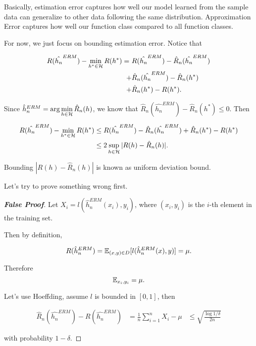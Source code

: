 \documentclass[../main.tex]{subfiles}
\begin{document}
	Basically, estimation error captures how well our model learned from the sample data can generalize to other data following the same distribution. Approximation Error captures how well our function class compared to all function classes.
	
	For now, we just focus on bounding estimation error. Notice that
	
	\begin{equation*}
		\begin{aligned}
				R(\hat{h_n}^{ERM}) - \min\limits_{h^* \in \mathcal{H}} R(h^*)  = \ &  R(\hat{h_n}^{ERM}) - \hat{R}_n(\hat{h_n}^{ERM}) \\
																		 + &\hat{R}_n(\hat{h_n}^{ERM}) - \hat{R}_n(h^*) \\
																		 + &\hat{R}_n(h^*) - R(h^*).
		\end{aligned}
	\end{equation*}
	
	Since $\hat{h}_n^{ERM} = \arg\min\limits_{h\in \mathcal{H}} \hat{R}_n(h)$, we know that $\hat{R}_n(\hat{h_n}^{ERM}) - \hat{R}_n(h^*) \leq 0$. Then
	
	\begin{equation*}
		\begin{aligned}
		R(\hat{h_n}^{ERM}) - \min\limits_{h^* \in \mathcal{H}} R(h^*)  & \leq    R(\hat{h_n}^{ERM}) - \hat{R}_n(\hat{h_n}^{ERM})+ \hat{R}_n(h^*) - R(h^*) \\
															  & \leq 2 \sup\limits_{h\in \mathcal{H}} |R(h) - \hat{R}_n(h)|.
		\end{aligned}
	\end{equation*}
	
	Bounding $|R(h) - \hat{R}_n(h)|$ is known as uniform deviation bound.
	
	Let's try to prove something wrong first.
	
	\begin{proof}[\bfseries False Proof]
		Let $X_i = l(\hat{h}_n^{ERM}(x_i),y_i)$, where $(x_i,y_i)$ is the $i$-th element in the training set.
		
		Then by definition,
		
		\begin{equation*}
			R(\hat{h}_n^{ERM}) = \mathbb{E}_{(x,y) \in D} [l(\hat{h}_n^{ERM}(x),y)] = \mu.
		\end{equation*}
		
		Therefore
		\begin{equation*}
					\mathbb{E}_{x_i,y_i} = \mu.
		\end{equation*}
	
	Let's use Hoeffding, assume $l$ is bounded in $[0,1]$, then
	
		\begin{equation*}
			\begin{aligned}
						\hat{R}_n(\hat{h_n}^{ERM}) - R(\hat{h_n}^{ERM}) & = \frac{1}{n} \sum\limits_{i=1}^n X_i  - \mu
																		& \leq \sqrt{\frac{\log 1 / \delta}{2n}}
			\end{aligned}
		\end{equation*} 
		
		with probability $1 - \delta$.
	\end{proof}
\end{document}

